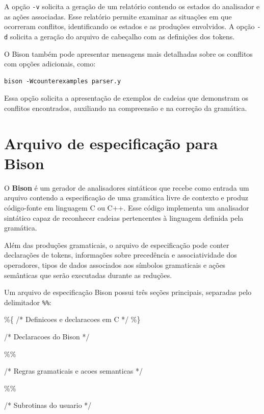 \documentclass[
  brazilian,
  letterpaper,
]{book}
\newenvironment{Shaded}{\begin{snugshade}}{\end{snugshade}}
\newcommand{\CommentTok}[1]{\textcolor[rgb]{0.37,0.37,0.37}{#1}}
\newcommand{\OperatorTok}[1]{\textcolor[rgb]{0.37,0.37,0.37}{#1}}
\theoremstyle{plain}
\theoremstyle{definition}
\theoremstyle{remark}
\begin{document}
A opção \texttt{-v} solicita a geração de um relatório contendo os
estados do analisador e as ações associadas. Esse relatório permite
examinar as situações em que ocorreram conflitos, identificando os
estados e as produções envolvidos. A opção \texttt{-d} solicita a
geração do arquivo de cabeçalho com as definições dos tokens.

O Bison também pode apresentar mensagens mais detalhadas sobre os
conflitos com opções adicionais, como:

\begin{verbatim}
bison -Wcounterexamples parser.y
\end{verbatim}

Essa opção solicita a apresentação de exemplos de cadeias que demonstram
os conflitos encontrados, auxiliando na compreensão e na correção da
gramática.

\section{Arquivo de especificação para
Bison}\label{arquivo-de-especificauxe7uxe3o-para-bison}

O \textbf{Bison} é um gerador de analisadores sintáticos que recebe como
entrada um arquivo contendo a especificação de uma gramática livre de
contexto e produz código-fonte em linguagem C ou C++. Esse código
implementa um analisador sintático capaz de reconhecer cadeias
pertencentes à linguagem definida pela gramática.

Além das produções gramaticais, o arquivo de especificação pode conter
declarações de tokens, informações sobre precedência e associatividade
dos operadores, tipos de dados associados aos símbolos gramaticais e
ações semânticas que serão executadas durante as reduções.

Um arquivo de especificação Bison possui três seções principais,
separadas pelo delimitador \texttt{\%\%}:

\begin{Shaded}
\begin{Highlighting}[]
\OperatorTok{\%\{}
    \CommentTok{/* Definicoes e declaracoes em C */}
\OperatorTok{\%\}}

\CommentTok{/* Declaracoes do Bison */}

\OperatorTok{\%\%}

\CommentTok{/* Regras gramaticais e acoes semanticas */}

\OperatorTok{\%\%}

\CommentTok{/* Subrotinas do usuario */}
\end{Highlighting}
\end{Shaded}
\end{document}
